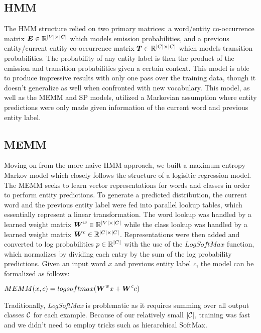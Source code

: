 \documentclass[11pt]{article}
\begin{document}
\subsection{HMM}

The HMM structure relied on two primary matrices: a word/entity co-occurrence matrix $\boldsymbol{E} \in \mathbb{R}^{|V| \times |C|}$ which models emission probabilities, and a previous entity/current entity co-occurrence matrix $\boldsymbol{T} \in \mathbb{R}^{|C| \times |C|}$ which models transition probabilities. The probability of any entity label is then the product of the emission and transition probabilities given a certain context. This model is able to produce impressive results with only one pass over the training data, though it doesn't generalize as well when confronted with new vocabulary. This model, as well as the MEMM and SP models, utilized a Markovian assumption where entity predictions were only made given information of the current word and previous entity label.

\subsection{MEMM}

Moving on from the more naive HMM approach, we built a maximum-entropy Markov model which closely follows the structure of a logisitic regression model. The MEMM seeks to learn vector representations for words and classes in order to perform entity predictions. To generate a predicted distribution, the current word and the previous entity label were fed into parallel lookup tables, which essentially represent a linear transformation. The word lookup was handled by a learned weight matrix $\boldsymbol{W}^{w} \in \mathbb{R}^{|V| \times |C|}$ while the class lookup was handled by a learned weight matrix $\boldsymbol{W}^{c} \in \mathbb{R}^{|C| \times |C|}$. Representations were then added and converted to log probabilities $p \in \mathbb{R}^{|C|}$ with the use of the $LogSoftMax$ function, which normalizes by dividing each entry by the sum of the log probability predictions. Given an input word $x$ and previous entity label $c$, the model can be formalized as follows:
\begin{center}
    $MEMM(x, c) = logsoftmax(\boldsymbol{W}^{w}x + \boldsymbol{W}^{c}c)$
\end{center}

Traditionally, \textit{LogSoftMax} is problematic as it requires summing over all output classes $\mathcal{C}$ for each example. Because of our relatively small $|\mathcal{C}|$, training was fast and we didn't need to employ tricks such as hierarchical SoftMax.
\end{document}
